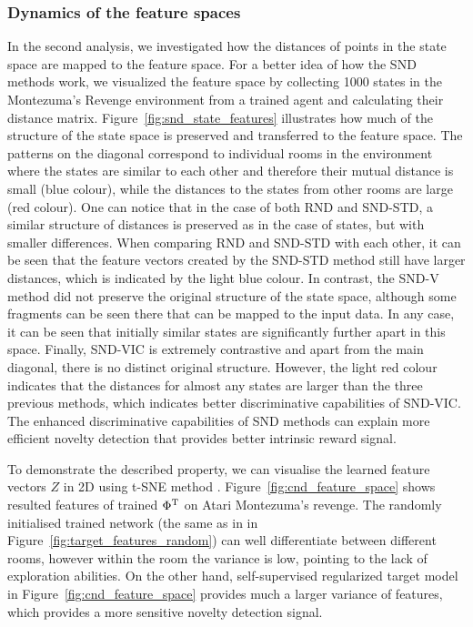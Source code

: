 \documentclass[a4paper,11pt]{elsarticle}
\begin{document}
\subsubsection{Dynamics of the feature spaces}

In the second analysis, we investigated how the distances of points in the state space are mapped to the feature space. For a better idea of how the SND methods work, we visualized the feature space by collecting 1000 states in the Montezuma's Revenge environment from a trained agent and calculating their distance matrix. Figure~\ref{fig:snd_state_features} illustrates how much of the structure of the state space is preserved and transferred to the feature space. The patterns on the diagonal correspond to individual rooms in the environment where the states are similar to each other and therefore their mutual distance is small (blue colour), while the distances to the states from other rooms are large (red colour). One can notice that in the case of both RND and SND-STD, a similar structure of distances is preserved as in the case of states, but with smaller differences. When comparing RND and SND-STD with each other, it can be seen that the feature vectors created by the SND-STD method still have larger distances, which is indicated by the light blue colour. In contrast, the SND-V method did not preserve the original structure of the state space, although some fragments can be seen there that can be mapped to the input data. In any case, it can be seen that initially similar states are significantly further apart in this space. Finally, SND-VIC is extremely contrastive and apart from the main diagonal, there is no distinct original structure. However, the light red colour indicates that the distances for almost any states are larger than the three previous methods, which indicates better discriminative capabilities of SND-VIC. The enhanced discriminative capabilities of SND methods can explain more efficient novelty detection that provides better intrinsic reward signal.

To demonstrate the described property, we can visualise the learned feature vectors $Z$ in 2D using t-SNE method \citep{tSNE2008}. Figure~\ref{fig:cnd_feature_space} shows resulted features of trained $\Phi^{\rm T}$ on Atari Montezuma's revenge. The randomly initialised trained network (the same as in \cite{burda2018exploration} in Figure~\ref{fig:target_features_random}) can well differentiate between different rooms, however within the room the variance is low, pointing to the lack of exploration abilities. On the other hand, self-supervised regularized target model in Figure~\ref{fig:cnd_feature_space} provides much a larger variance of features, which provides a more sensitive novelty detection signal.
\end{document}
